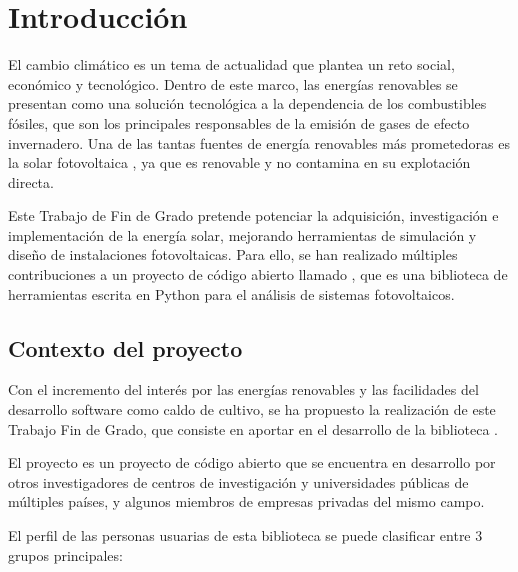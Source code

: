 \chapter{Introducción} \label{chp:intro}

El cambio climático es un tema de actualidad que plantea un reto social, económico y tecnológico. Dentro de este marco, las energías renovables se presentan como una solución tecnológica a la dependencia de los combustibles fósiles, que son los principales responsables de la emisión de gases de efecto invernadero. Una de las tantas fuentes de energía renovables más prometedoras es la solar \gls{fotovoltaica} \cite{Breyer_Bogdanov_Gulagi_Aghahosseini_Barbosa_Koskinen_Barasa_Caldera_Afanasyeva_Child_et_al_2017}, ya que es renovable y no contamina en su explotación directa.

Este Trabajo de Fin de Grado pretende potenciar la adquisición, investigación e implementación de la energía solar, mejorando herramientas de \gls{simulación} y diseño de instalaciones fotovoltaicas. Para ello, se han realizado múltiples contribuciones a un proyecto de código abierto llamado \pvlibpy{} \cite{Anderson_Hansen_Holmgren_Jensen_Mikofski_Driesse_2023, Stein_2012, Andrews_Stein_Hansen_Riley_2014, Holmgren_Andrews_Lorenzo_Stein_2015, Holmgren_Groenendyk_2016}, que es una biblioteca de herramientas escrita en \gls{Python} para el análisis de sistemas fotovoltaicos.


\section{Contexto del proyecto} \label{sct:intro:contexto}

Con el incremento del interés por las energías renovables y las facilidades del desarrollo \gls{software} como caldo de cultivo, se ha propuesto la realización de este Trabajo Fin de Grado, que consiste en aportar en el desarrollo de la biblioteca \pvlibpy.

El proyecto \pvlibpy{} es un proyecto de código abierto que se encuentra en desarrollo por otros investigadores de centros de investigación y universidades públicas de múltiples países, y algunos miembros de empresas privadas del mismo campo.

El perfil de las personas usuarias de esta biblioteca se puede clasificar entre 3 grupos principales:

